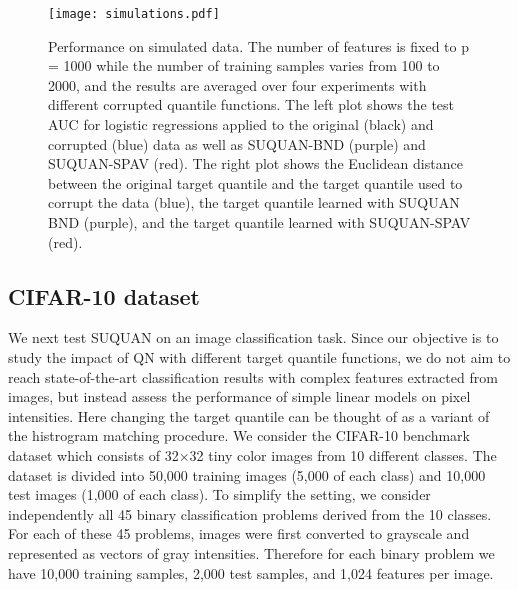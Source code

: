 \documentclass{article}
\begin{document}
\begin{figure}[hb]
\centering
\texttt{[image: simulations.pdf]}
\caption{Performance on simulated data. The number of features is fixed to p = 1000 while the number of training samples varies from 100 to 2000, and the results are averaged over four experiments with different corrupted quantile functions. The left plot shows the test AUC for logistic regressions applied to the original (black) and corrupted (blue) data as well as SUQUAN-BND (purple) and SUQUAN-SPAV (red). The right plot shows the Euclidean distance between the original target quantile and the target quantile used to corrupt the data (blue), the target quantile learned with SUQUAN BND (purple), and the target quantile learned with SUQUAN-SPAV (red). }
\label{fig:simulations}
\end{figure}

\subsection{CIFAR-10 dataset}

We next test SUQUAN on an image classification task. Since our objective is to study the impact of QN with different target quantile functions, we do not aim to reach state-of-the-art classification results with complex features extracted from images, but instead assess the performance of simple linear models on pixel intensities. Here changing the target quantile can be thought of as a variant of the histrogram matching procedure. We consider the CIFAR-10 benchmark dataset \cite{Krizhevsky2009Learning} which consists of 32$\times$32 tiny color images from 10 different classes. The dataset is divided into 50,000 training images (5,000 of each class) and 10,000 test images (1,000 of each class). To simplify the setting, we consider independently all 45 binary classification problems derived from the 10 classes. For each of these 45 problems, images were first converted to grayscale and represented as vectors of gray intensities. Therefore for each binary problem we have 10,000 training samples, 2,000 test samples, and 1,024 features per image.
\end{document}

